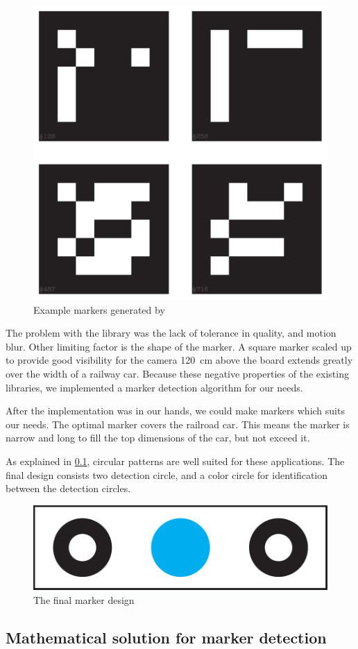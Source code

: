\begin{figure}[h]
	\centering
	\includegraphics[width=0.35\linewidth]{include/figures/chapter_6/opencv_2}
	\caption{Example markers generated by }
	\label{fig:case_study:aruco_markers}
\end{figure}

The problem with the library was the lack of tolerance in quality, and motion blur. Other limiting factor is the shape of the marker. A square marker scaled up to provide good visibility for the camera 120~\si{\centi\meter} above the board extends greatly over the width of a railway car. Because these negative properties of the existing libraries, we implemented a marker detection algorithm for our needs.

After the implementation was in our hands, we could make markers which suits our needs. The optimal marker covers the railroad car. This means the marker is narrow and long to fill the top dimensions of the car, but not exceed it.

As explained in \cref{fig:case_study:opencv_math}, circular patterns are well suited for these applications. The final design consists two detection circle, and a color circle for identification between the detection circles.

\begin{figure}[h]
	\centering
	\includegraphics[width=0.75\linewidth]{include/figures/chapter_6/opencv_3}
	\caption{The final marker design}
	\label{fig:case_study:marker}
\end{figure}

\subsection{Mathematical solution for marker detection}
\label{fig:case_study:opencv_math}

